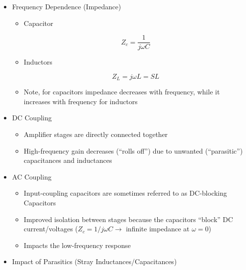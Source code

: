 \begin{itemize}

  \item Frequency Dependence (Impedance)

    \begin{itemize}

      \item Capacitor

        $$Z_c=\frac{1}{j\omega C}$$

      \item Inductors

        $$Z_L=j\omega L=SL$$

      \item Note, for capacitors impedance decreases with frequency, while it increases with frequency for inductors

    \end{itemize}

  \item DC Coupling
    
    \begin{itemize}

      \item Amplifier stages are directly connected together

      \item High-frequency gain decreases (``rolls off'') due to unwanted (``parasitic'') capacitances and inductances

    \end{itemize}

  \item AC Coupling

    \begin{itemize}

      \item Input-coupling capacitors are sometimes referred to as DC-blocking Capacitors

      \item Improved isolation between stages because the capacitors ``block'' DC current/voltages ($Z_c=1/j\omega C\to$ infinite impedance at $\omega=0$)

      \item Impacts the low-frequency response

    \end{itemize}

  \item Impact of Parasitics (Stray Inductances/Capacitances)

    \begin{itemize}


\end{itemize}
\end{itemize}
